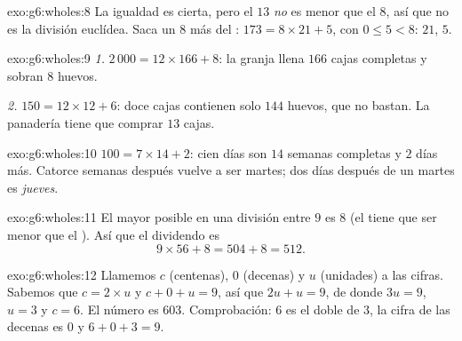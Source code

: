 \begin{solution}{exo:g6:wholes:8}
La igualdad es cierta, pero el  $13$ \emph{no} es menor que
el  $8$, así que no es la división euclídea. Saca un $8$ más
del : $173 = 8 \times 21 + 5$, con $0 \leq 5 < 8$:
 $21$,  $5$.
\end{solution}

\begin{solution}{exo:g6:wholes:9}
\emph{1.} $2\,000 = 12 \times 166 + 8$: la granja llena $166$ cajas
completas y sobran $8$ huevos.

\emph{2.} $150 = 12 \times 12 + 6$: doce cajas contienen solo $144$
huevos, que no bastan. La panadería tiene que comprar $13$ cajas.
\end{solution}

\begin{solution}{exo:g6:wholes:10}
$100 = 7 \times 14 + 2$: cien días son $14$ semanas completas y $2$
días más. Catorce semanas después vuelve a ser martes; dos días después de un
martes es \emph{jueves}.
\end{solution}

\begin{solution}{exo:g6:wholes:11}
El mayor  posible en una división entre $9$ es $8$ (el
 tiene que ser menor que el ). Así que el dividendo es
\[
9 \times 56 + 8 = 504 + 8 = 512 .
\]
\end{solution}

\begin{solution}{exo:g6:wholes:12}
Llamemos $c$ (centenas), $0$ (decenas) y $u$ (unidades) a las cifras. Sabemos que
$c = 2 \times u$ y $c + 0 + u = 9$, así que $2u + u = 9$, de donde
$3u = 9$, $u = 3$ y $c = 6$. El número es $603$. Comprobación: $6$ es
el doble de $3$, la cifra de las decenas es $0$ y $6 + 0 + 3 = 9$.
\end{solution}

